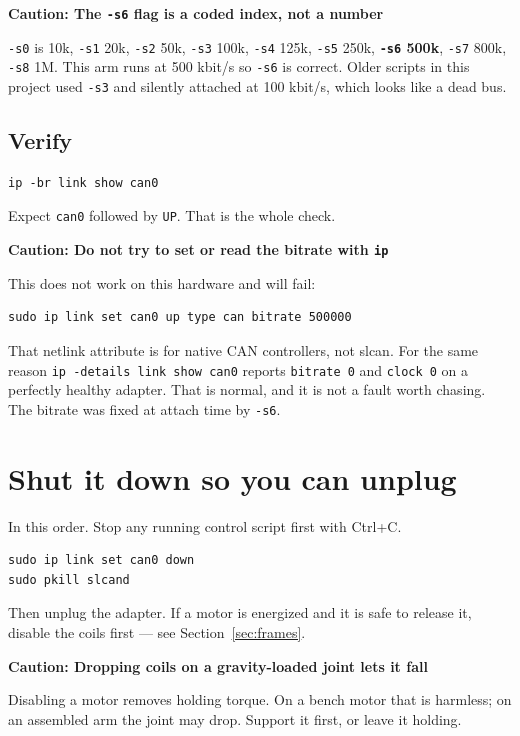 \documentclass[11pt,letterpaper]{article}
\newenvironment{caution}[1]{%
    \par\addvspace{8pt}%
    \noindent{\color{cautionred}\rule{\linewidth}{0.8pt}}\par\vspace{2pt}
    \noindent\textbf{\color{cautionred}Caution: #1}\par\vspace{2pt}
}{%
    \par\vspace{2pt}\noindent{\color{cautionred}\rule{\linewidth}{0.4pt}}%
    \par\addvspace{8pt}%
}
\begin{document}
\begin{caution}{The \texttt{-s6} flag is a coded index, not a number}
\texttt{-s0} is 10k, \texttt{-s1} 20k, \texttt{-s2} 50k, \texttt{-s3} 100k,
\texttt{-s4} 125k, \texttt{-s5} 250k, \textbf{\texttt{-s6} 500k}, \texttt{-s7}
800k, \texttt{-s8} 1M. This arm runs at 500 kbit/s so \texttt{-s6} is correct.
Older scripts in this project used \texttt{-s3} and silently attached at
100 kbit/s, which looks like a dead bus.
\end{caution}

\subsection{Verify}
\begin{lstlisting}
ip -br link show can0
\end{lstlisting}

Expect \texttt{can0} followed by \texttt{UP}. That is the whole check.

\begin{caution}{Do not try to set or read the bitrate with \texttt{ip}}
This does not work on this hardware and will fail:
\begin{lstlisting}
sudo ip link set can0 up type can bitrate 500000
\end{lstlisting}
That netlink attribute is for native CAN controllers, not slcan. For the same
reason \texttt{ip -details link show can0} reports \texttt{bitrate 0} and
\texttt{clock 0} on a perfectly healthy adapter. That is normal, and it is not a
fault worth chasing. The bitrate was fixed at attach time by \texttt{-s6}.
\end{caution}

\section{Shut it down so you can unplug}

In this order. Stop any running control script first with Ctrl+C.

\begin{lstlisting}
sudo ip link set can0 down
sudo pkill slcand
\end{lstlisting}

Then unplug the adapter. If a motor is energized and it is safe to release it,
disable the coils first --- see Section~\ref{sec:frames}.

\begin{caution}{Dropping coils on a gravity-loaded joint lets it fall}
Disabling a motor removes holding torque. On a bench motor that is harmless; on an
assembled arm the joint may drop. Support it first, or leave it holding.
\end{caution}
\end{document}
